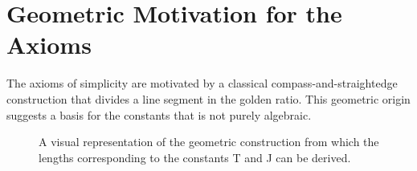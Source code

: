 \documentclass{amsart}
\theoremstyle{plain}
\theoremstyle{definition}
\theoremstyle{remark}
\begin{document}
\appendix
\section{Geometric Motivation for the Axioms}
The axioms of simplicity are motivated by a classical compass-and-straightedge construction that divides a line segment in the golden ratio. This geometric origin suggests a basis for the constants that is not purely algebraic.

\begin{figure}[htbp]
    \centering
    \caption{A visual representation of the geometric construction from which the lengths corresponding to the constants T and J can be derived.}
    \label{fig:geometry}
\end{figure}
\end{document}
